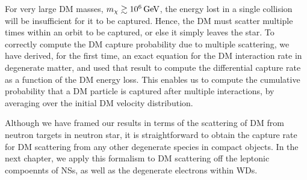 For very large DM masses, $m_\chi\gtrsim10^6{\rm \,GeV}$, the energy lost in a single collision will be insufficient for it to be captured. Hence, the DM must scatter multiple times within an orbit to be captured, or else it simply leaves the star. To correctly compute the DM capture probability due to multiple scattering, we have derived, for the first time, an exact equation for the DM interaction rate in degenerate matter, and used that result to compute the differential capture rate as a function of the DM energy loss. This enables us to compute the cumulative probability that a DM particle is captured after multiple interactions, by averaging over the initial DM velocity distribution.


Although we have framed our results in terms of the scattering of DM from neutron targets in neutron star, it is straightforward to obtain the capture rate for DM scattering from any other degenerate species in compact objects. In the next chapter, we apply this formalism to DM scattering off the leptonic compoennts of NSs, as well as the degenerate electrons within WDs.
